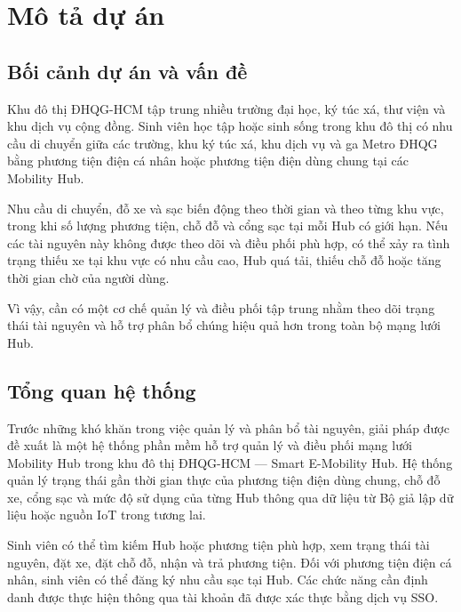 
\begingroup

\sloppy

\setlength{\parindent}{1.2cm}

\setlength{\parskip}{0.35em}

\section{Mô tả dự án}
\subsection{Bối cảnh dự án và vấn đề}
Khu đô thị ĐHQG-HCM tập trung nhiều trường đại học, ký túc xá, thư viện và khu dịch vụ cộng đồng. Sinh viên học tập hoặc sinh sống trong khu đô thị có nhu cầu di chuyển giữa các trường, khu ký túc xá, khu dịch vụ và ga Metro ĐHQG bằng phương tiện điện cá nhân hoặc phương tiện điện dùng chung tại các Mobility Hub.

Nhu cầu di chuyển, đỗ xe và sạc biến động theo thời gian và theo từng khu vực, trong khi số lượng phương tiện, chỗ đỗ và cổng sạc tại mỗi Hub có giới hạn. Nếu các tài nguyên này không được theo dõi và điều phối phù hợp, có thể xảy ra tình trạng thiếu xe tại khu vực có nhu cầu cao, Hub quá tải, thiếu chỗ đỗ hoặc tăng thời gian chờ của người dùng.

Vì vậy, cần có một cơ chế quản lý và điều phối tập trung nhằm theo dõi trạng thái tài nguyên và hỗ trợ phân bổ chúng hiệu quả hơn trong toàn bộ mạng lưới Hub.

\setcounter{subsection}{1}

\subsection{Tổng quan hệ thống}

Trước những khó khăn trong việc quản lý và phân bổ tài nguyên, giải pháp được đề xuất là một hệ thống phần mềm hỗ trợ quản lý và điều phối mạng lưới Mobility Hub trong khu đô thị ĐHQG-HCM — Smart E-Mobility Hub. Hệ thống quản lý trạng thái gần thời gian thực của phương tiện điện dùng chung, chỗ đỗ xe, cổng sạc và mức độ sử dụng của từng Hub thông qua dữ liệu từ Bộ giả lập dữ liệu hoặc nguồn IoT trong tương lai.

Sinh viên có thể tìm kiếm Hub hoặc phương tiện phù hợp, xem trạng thái tài nguyên, đặt xe, đặt chỗ đỗ, nhận và trả phương tiện. Đối với phương tiện điện cá nhân, sinh viên có thể đăng ký nhu cầu sạc tại Hub. Các chức năng cần định danh được thực hiện thông qua tài khoản đã được xác thực bằng dịch vụ SSO.

